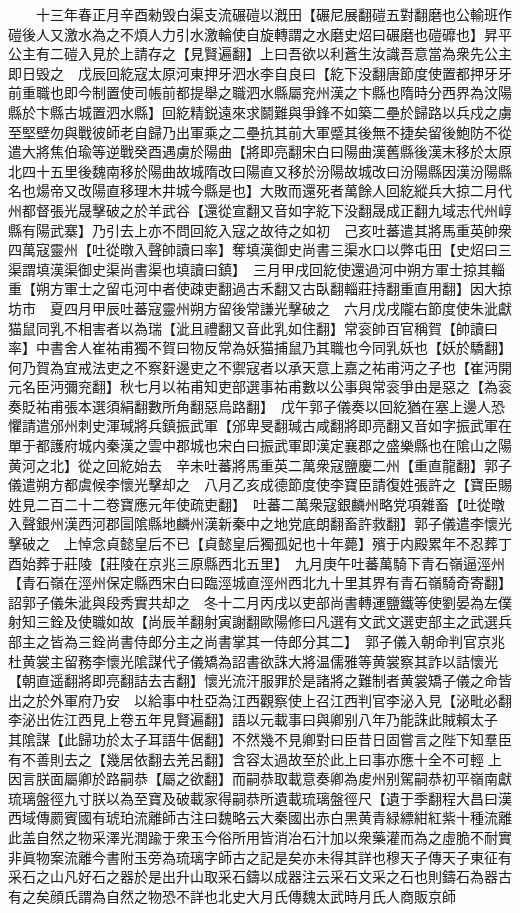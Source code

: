 　　十三年春正月辛酉勑毁白渠支流碾磑以漑田【碾尼展翻磑五對翻磨也公輸班作磑後人又激水為之不煩人力引水激輪使自旋轉謂之水磨史炤曰碾磨也磑䃺也】昇平公主有二磑入見於上請存之【見賢遍翻】上曰吾欲以利蒼生汝識吾意當為衆先公主即日毁之　戊辰回紇寇太原河東押牙泗水李自良曰【紇下没翻唐節度使置都押牙牙前重職也即今制置使司帳前都提舉之職泗水縣屬兖州漢之卞縣也隋時分西界為汶陽縣於卞縣古城置泗水縣】回紇精鋭遠來求鬬難與爭鋒不如築二壘於歸路以兵戍之虜至堅壁勿與戰彼師老自歸乃出軍乘之二壘抗其前大軍蹙其後無不捷矣留後鮑防不從遣大將焦伯瑜等逆戰癸酉遇虜於陽曲【將即亮翻宋白曰陽曲漢舊縣後漢末移於太原北四十五里後魏南移於陽曲故城隋改曰陽直又移於汾陽故城改曰汾陽縣因漢汾陽縣名也煬帝又改陽直移理木井城今縣是也】大敗而還死者萬餘人回紇縱兵大掠二月代州都督張光晟擊破之於羊武谷【還從宣翻又音如字紇下没翻晟成正翻九域志代州崞縣有陽武寨】乃引去上亦不問回紇入寇之故待之如初　己亥吐蕃遣其將馬重英帥衆四萬寇靈州【吐從暾入聲帥讀曰率】奪填漢御史尚書三渠水口以弊屯田【史炤曰三渠謂填漢渠御史渠尚書渠也填讀曰鎮】　三月甲戌回紇使還過河中朔方軍士掠其輜重【朔方軍士之留屯河中者使疎吏翻過古禾翻又古臥翻輜莊持翻重直用翻】因大掠坊市　夏四月甲辰吐蕃寇靈州朔方留後常謙光擊破之　六月戊戌隴右節度使朱泚獻猫鼠同乳不相害者以為瑞【泚且禮翻又音此乳如住翻】常衮帥百官稱賀【帥讀曰率】中書舍人崔祐甫獨不賀曰物反常為妖猫捕鼠乃其職也今同乳妖也【妖於驕翻】何乃賀為宜戒法吏之不察姧邊吏之不禦寇者以承天意上嘉之祐甫沔之子也【崔沔開元名臣沔彌兖翻】秋七月以祐甫知吏部選事祐甫數以公事與常衮爭由是惡之【為衮奏貶祐甫張本選須絹翻數所角翻惡烏路翻】　戊午郭子儀奏以回紇猶在塞上邊人恐懼請遣邠州刺史渾瑊將兵鎮振武軍【邠卑旻翻瑊古咸翻將即亮翻又音如字振武軍在單于都護府城内秦漢之雲中郡城也宋白曰振武軍即漢定襄郡之盛樂縣也在隂山之陽黄河之北】從之回紇始去　辛未吐蕃將馬重英二萬衆寇鹽慶二州【重直龍翻】郭子儀遣朔方都虞候李懷光擊却之　八月乙亥成德節度使李寶臣請復姓張許之【寶臣賜姓見二百二十二卷寶應元年使疏吏翻】　吐蕃二萬衆寇銀麟州略党項雜畜【吐從暾入聲銀州漢西河郡圁隂縣地麟州漢新秦中之地党底朗翻畜許救翻】郭子儀遣李懷光擊破之　上悼念貞懿皇后不已【貞懿皇后獨孤妃也十年薨】殯于内殿累年不忍葬丁酉始葬于莊陵【莊陵在京兆三原縣西北五里】　九月庚午吐蕃萬騎下青石嶺逼涇州【青石嶺在涇州保定縣西宋白曰臨涇城直涇州西北九十里其界有青石嶺騎奇寄翻】詔郭子儀朱泚與段秀實共却之　冬十二月丙戌以吏部尚書轉運鹽鐵等使劉晏為左僕射知三銓及使職如故【尚辰羊翻射寅謝翻歐陽修曰凡選有文武文選吏部主之武選兵部主之皆為三銓尚書侍郎分主之尚書掌其一侍郎分其二】　郭子儀入朝命判官京兆杜黄裳主留務李懷光隂謀代子儀矯為詔書欲誅大將温儒雅等黄裳察其詐以詰懷光【朝直遥翻將即亮翻詰去吉翻】懷光流汗服罪於是諸將之難制者黄裳矯子儀之命皆出之於外軍府乃安　以給事中杜亞為江西觀察使上召江西判官李泌入見【泌毗必翻李泌出佐江西見上卷五年見賢遍翻】語以元載事曰與卿别八年乃能誅此賊賴太子其隂謀【此歸功於太子耳語牛倨翻】不然幾不見卿對曰臣昔日固嘗言之陛下知羣臣有不善則去之【幾居依翻去羌呂翻】含容太過故至於此上曰事亦應十全不可輕上因言朕面屬卿於路嗣恭【屬之欲翻】而嗣恭取載意奏卿為䖍州别駕嗣恭初平嶺南獻琉璃盤徑九寸朕以為至寶及破載家得嗣恭所遺載琉璃盤徑尺【遺于季翻程大昌曰漢西域傳罽賓國有琥珀流離師古注曰魏略云大秦國出赤白黑黄青緑縹紺紅紫十種流離此盖自然之物采澤光潤踰于衆玉今俗所用皆消冶石汁加以衆藥灌而為之虛脆不耐實非眞物案流離今書附玉旁為琉璃字師古之記是矣亦未得其詳也穆天子傳天子東征有采石之山凡好石之器於是出升山取采石鑄以成器注云采石文采之石也則鑄石為器古有之矣顔氏謂為自然之物恐不詳也北史大月氏傳魏太武時月氏人商販京師